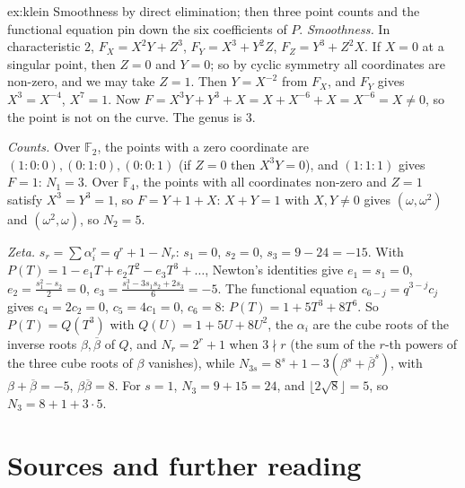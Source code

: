 \begin{solution}{ex:klein}
\idea Smoothness by direct elimination; then three point counts and the functional equation pin down the six coefficients of $P$.
\writeup \emph{Smoothness.} In characteristic $2$, $F_X=X^2Y+Z^3$, $F_Y=X^3+Y^2Z$, $F_Z=Y^3+Z^2X$. If $X=0$ at a singular point, then $Z=0$ and $Y=0$; so
by cyclic symmetry all coordinates are non-zero, and we may take $Z=1$. Then $Y=X^{-2}$ from $F_X$, and $F_Y$ gives $X^3=X^{-4}$, $X^7=1$. Now
$F=X^3Y+Y^3+X=X+X^{-6}+X=X^{-6}=X\ne0$, so the point is not on the curve. The genus is $3$.

\emph{Counts.} Over $\mathbb F_2$, the points with a zero coordinate are $(1:0:0),(0:1:0),(0:0:1)$ (if $Z=0$ then $X^3Y=0$), and $(1:1:1)$ gives $F=1$: $N_1=3$. Over
$\mathbb F_4$, the points with all coordinates non-zero and $Z=1$ satisfy $X^3=Y^3=1$, so $F=Y+1+X$: $X+Y=1$ with $X,Y\ne0$ gives $(\omega,\omega^2)$ and
$(\omega^2,\omega)$, so $N_2=5$.

\emph{Zeta.} $s_r=\sum\alpha_i^r=q^r+1-N_r$: $s_1=0$, $s_2=0$, $s_3=9-24=-15$. With $P(T)=1-e_1T+e_2T^2-e_3T^3+\dots$, Newton's identities give $e_1=s_1=0$,
$e_2=\frac{s_1^2-s_2}2=0$, $e_3=\frac{s_1^3-3s_1s_2+2s_3}6=-5$. The functional equation $c_{6-j}=q^{3-j}c_j$ gives $c_4=2c_2=0$, $c_5=4c_1=0$, $c_6=8$:
$P(T)=1+5T^3+8T^6$. So $P(T)=Q(T^3)$ with $Q(U)=1+5U+8U^2$, the $\alpha_i$ are the cube roots of the inverse roots $\beta,\overline\beta$ of $Q$, and
$N_r=2^r+1$ when $3\nmid r$ (the sum of the $r$-th powers of the three cube roots of $\beta$ vanishes), while $N_{3s}=8^s+1-3(\beta^s+\overline\beta^s)$, with
$\beta+\overline\beta=-5$, $\beta\overline\beta=8$. For $s=1$, $N_3=9+15=24$, and $\lfloor2\sqrt8\rfloor=5$, so $N_3=8+1+3\cdot5$.
\end{solution}

\section*{Sources and further reading}

